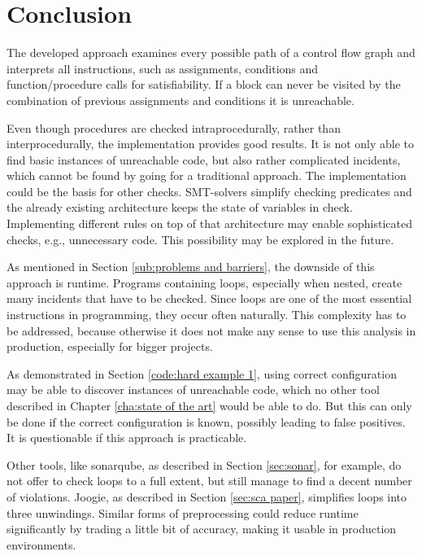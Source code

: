 
\chapter{Conclusion}
\label{cha:conclusion}

The developed approach examines every possible path of a control flow graph and interprets all instructions, such as assignments, conditions and function/procedure calls for satisfiability. If a block can never be visited by the combination of previous assignments and conditions it is unreachable.

Even though procedures are checked intraprocedurally, rather than interprocedurally, the implementation provides good results. It is not only able to find basic instances of unreachable code, but also rather complicated incidents, which cannot be found by going for a traditional approach. 
The implementation could be the basis for other checks. SMT-solvers simplify checking predicates and the already existing architecture keeps the state of variables in check. 
Implementing different rules on top of that architecture may enable sophisticated checks, e.g., unnecessary code.
This possibility may be explored in the future.


As mentioned in Section \ref{sub:problems and barriers}, the downside of this approach is runtime. Programs containing loops, especially when nested, create many incidents that have to be checked. Since loops are one of the most essential instructions in programming, they occur often naturally. 
This complexity has to be addressed, because otherwise it does not make any sense to use this analysis in production, especially for bigger projects.


As demonstrated in Section \ref{code:hard example 1}, using correct configuration may be able to discover instances of unreachable code, which no other tool described in Chapter \ref{cha:state of the art} would be able to do. But this can only be done if the correct configuration is known, possibly leading to false positives. It is questionable if this approach is practicable.


Other tools, like sonarqube, as described in Section \ref{sec:sonar}, for example, do not offer to check loops to a full extent, but still manage to find a decent number of violations. Joogie, as described in Section \ref{sec:sca paper}, simplifies loops into three unwindings. Similar forms of preprocessing could reduce runtime significantly by trading a little bit of accuracy, making it usable in production environments. 

